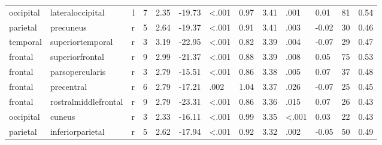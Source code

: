 \documentclass{article}
\begin{document}
\begin{longtable}{llrR{1.3cm}R{1cm}R{1.3cm}R{1cm}R{1cm}R{1.3cm}R{1cm}R{1.8cm}R{1.3cm}R{1.8cm}}
 occipital &          lateraloccipital &    l &         7 &                  2.35 &           -19.73 &      \textless.001 &                               0.97 &                          3.41 &                            .001 &   0.01 &     81 &      0.54 \\
  parietal &                 precuneus &    r &         5 &                  2.64 &           -19.37 &      \textless.001 &                               0.91 &                          3.41 &                            .003 &  -0.02 &     30 &      0.46 \\
  temporal &          superiortemporal &    r &         3 &                  3.19 &           -22.95 &      \textless.001 &                               0.82 &                          3.39 &                            .004 &  -0.07 &     29 &      0.47 \\
   frontal &           superiorfrontal &    r &         9 &                  2.99 &           -21.37 &      \textless.001 &                               0.88 &                          3.39 &                            .008 &   0.05 &     75 &      0.53 \\
   frontal &           parsopercularis &    r &         3 &                  2.79 &           -15.51 &      \textless.001 &                               0.86 &                          3.38 &                            .005 &   0.07 &     37 &      0.48 \\
   frontal &                precentral &    r &         6 &                  2.79 &           -17.21 &               .002 &                               1.04 &                          3.37 &                            .026 &  -0.07 &     25 &      0.45 \\
   frontal &      rostralmiddlefrontal &    r &         9 &                  2.79 &           -23.31 &      \textless.001 &                               0.86 &                          3.36 &                            .015 &   0.07 &     26 &      0.43 \\
 occipital &                    cuneus &    r &         3 &                  2.33 &           -16.11 &      \textless.001 &                               0.99 &                          3.35 &                   \textless.001 &   0.03 &     22 &      0.43 \\
  parietal &          inferiorparietal &    r &         5 &                  2.62 &           -17.94 &      \textless.001 &                               0.92 &                          3.32 &                            .002 &  -0.05 &     50 &      0.49 \\

\end{longtable}
\end{document}
